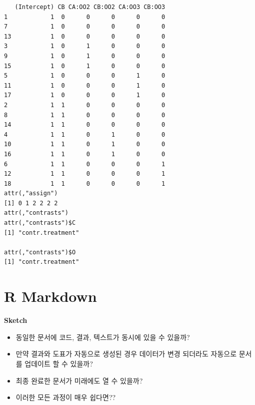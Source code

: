 \documentclass[
  11pt,
]{krantz}
\makeatletter
\providecommand{\tightlist}{%
  \setlength{\itemsep}{0pt}\setlength{\parskip}{0pt}}
\newenvironment{kframe}{%
\medskip{}
\setlength{\fboxsep}{.8em}
 \def\at@end@of@kframe{}%
 \ifinner\ifhmode%
  \def\at@end@of@kframe{\end{minipage}}%
  \begin{minipage}{\columnwidth}%
 \fi\fi%
 \def\FrameCommand##1{\hskip\@totalleftmargin \hskip-\fboxsep
 \colorbox{shadecolor}{##1}\hskip-\fboxsep
     \hskip-\linewidth \hskip-\@totalleftmargin \hskip\columnwidth}%
 \MakeFramed {\advance\hsize-\width
   \@totalleftmargin\z@ \linewidth\hsize
   \@setminipage}}%
 {\par\unskip\endMakeFramed%
 \at@end@of@kframe}
\renewenvironment{quote}{\begin{kframe}}{\end{kframe}}
\makeatother
\begin{document}
\begin{verbatim}
   (Intercept) CB CA:OO2 CB:OO2 CA:OO3 CB:OO3
1            1  0      0      0      0      0
7            1  0      0      0      0      0
13           1  0      0      0      0      0
3            1  0      1      0      0      0
9            1  0      1      0      0      0
15           1  0      1      0      0      0
5            1  0      0      0      1      0
11           1  0      0      0      1      0
17           1  0      0      0      1      0
2            1  1      0      0      0      0
8            1  1      0      0      0      0
14           1  1      0      0      0      0
4            1  1      0      1      0      0
10           1  1      0      1      0      0
16           1  1      0      1      0      0
6            1  1      0      0      0      1
12           1  1      0      0      0      1
18           1  1      0      0      0      1
attr(,"assign")
[1] 0 1 2 2 2 2
attr(,"contrasts")
attr(,"contrasts")$C
[1] "contr.treatment"

attr(,"contrasts")$O
[1] "contr.treatment"
\end{verbatim}

\normalsize

\mainmatter

\hypertarget{r-markdown}{%
\chapter{R Markdown}\label{r-markdown}}

\begin{quote}
\textbf{Sketch}

\begin{itemize}
\tightlist
\item
  동일한 문서에 코드, 결과, 텍스트가 동시에 있을 수 있을까?
\item
  만약 결과와 도표가 자동으로 생성된 경우 데이터가 변경 되더라도 자동으로 문서를 업데이트 할 수 있을까?
\item
  최종 완료한 문서가 미래에도 열 수 있을까?
\item
  이러한 모든 과정이 매우 쉽다면??
\end{itemize}
\end{quote}

\footnotesize
\end{document}
